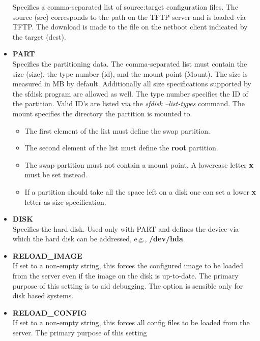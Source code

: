 \begin{itemize}
        Specifies a comma-separated list of source:target
        configuration files. The source (src) corresponds to the path
        on the TFTP server and is loaded via TFTP. The
        download is made to the file on the netboot client
        indicated by the target (dest).
    \item \textbf{PART}\\
        Specifies the partitioning data. The comma-separated list
        must contain the size (size), the type number (id), and the
        mount point (Mount). The size is measured in MB by default.
        Additionally all size specifications supported by the sfdisk
        program are allowed as well. The type number specifies the ID
        of the partition. Valid ID's are listed via the
        \textit{sfdisk --list-types} command. The mount specifies the
        directory the partition is mounted to.
        \begin{itemize}
            \item The first element of the list must define the swap
                  partition.
            \item The second element of the list must define the
                  \textbf{root} partition.
            \item The swap partition must not contain a mount point.
                  A lowercase letter \textbf{x} must be set instead.
            \item If a partition should take all the space left on
                  a disk one can set a lower \textbf{x} letter as
                  size specification.
        \end{itemize}
    \item \textbf{DISK}\\
        Specifies the hard disk. Used only with PART and defines
        the device via which the hard disk can be addressed,
        e.g., \textbf{/dev/hda}.
    \item \textbf{RELOAD\_IMAGE}\\
        If set to a non-empty string, this forces the configured
        image to be loaded from the server even if the image on
        the disk is up-to-date. The primary purpose of this setting
        is to aid debugging. The option is sensible only for disk based
        systems.
    \item \textbf{RELOAD\_CONFIG}\\
        If set to a non-empty string, this forces all config files
        to be loaded from the server. The primary purpose of this setting

\end{itemize}
